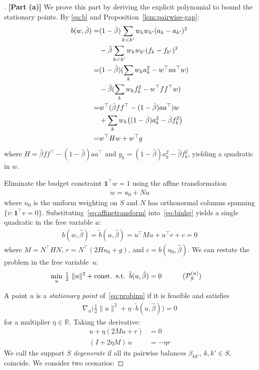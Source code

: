 \documentclass[11pt]{article}
\begin{document}
\begin{proof}[]
\textbf{[Part (a)]} We prove this part by deriving the explicit polynomial to bound the stationary points.
By \eqref{eq:b} and Proposition~\ref{lem:pairwise-gap}:
\begin{align}
  b(w,\hat\beta) = &(1-\hat\beta)\sum_{k<k'} w_k w_{k'} (a_k - a_{k'})^2 \notag\\
  &- \hat\beta\sum_{k<k'} w_k w_{k'} (f_k - f_{k'})^2\label{eq:bpairwise}\\
  = &(1-\hat\beta)  (\sum_{k} w_k a_k^2 -w^\top aa^\top w) \notag\\
  &- \hat\beta (\sum_{k} w_k f_k^2 -w^\top ff^\top w)\\
  = &w^\top (\hat\beta ff^\top - (1-\hat\beta)aa^\top ) w \notag\\
  &+ \sum_k w_k\big( (1-\hat\beta) a_k^2 - \hat\beta f_k^2 \big)\\
  = &w^\top H w + w^\top g \label{eq:binhg}
\end{align}
where $H = \hat\beta ff^\top - (1-\hat\beta)aa^\top$ and $g_k = (1{-}\hat\beta) a_k^2 - \hat\beta f_k^2$, yielding a quadratic in $w$.

Eliminate the budget constraint $\mathbf 1^\top w=1$ using the affine transformation
\begin{align}
    w = u_0 + Nu\label{eq:affinetransform}
\end{align}
where $u_0$ is the uniform weighting on $S$ and $N$ has orthonormal columns spanning $\{v: \mathbf 1^\top v=0\}$.
Substituting~\eqref{eq:affinetransform} into~\eqref{eq:binhg} yields a single quadratic in the free variable $u$:
\begin{align}
    b(w, \hat\beta) = \tilde{b}(u, \hat\beta) = u^\top M u + u^\top r + c = 0 \label{eq:tildeb}
\end{align}
where $M = N^\top H N$, $r = N^\top (2Hu_0+g)$, and $c=b(u_0,\hat\beta)$.
We can restate the problem in the free variable~$u$:
\begin{align}
  \min_u&\ \tfrac12\ \|u\|^2 + \mathrm{const.} \;\; \text{s.t.}\;\;\tilde{b}(u, \hat\beta)=0\quad\label{eq:probinu}\tag{$\mathcal{P}_S^{(u)}$}
\end{align}

A point $u$ is a \emph{stationary point} of~\eqref{eq:probinu} if it is feasible and satisfies
\begin{align}
\nabla_u{\big(\tfrac12\|u\|^2 + \eta\cdot\tilde b(u, \hat\beta)\big)} = 0
\end{align}
for a multiplier $\eta \in \mathbb R$. Taking the derivative:
\begin{align}
u + \eta(2 M u + r) &= 0 \\
(I+2\eta M)\,u &= -\eta r \label{eq:stat-u}
\end{align}
We call the support $S$ \emph{degenerate} if all its pairwise balances $\beta_{kk'}$, $k,k' \in S$, coincide. We consider two scenarios:


\end{proof}
\end{document}
